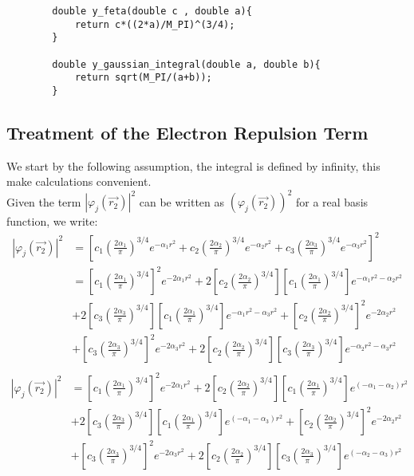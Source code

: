 \documentclass{article}
\begin{document}
\begin{lstlisting}
        double y_feta(double c , double a){
            return c*((2*a)/M_PI)^(3/4);
        }

        double y_gaussian_integral(double a, double b){
            return sqrt(M_PI/(a+b));
        }
\end{lstlisting}

\subsection{Treatment of the Electron Repulsion Term}
We start by the following assumption, the integral is defined by infinity, this make calculations convenient.\\
Given the term \( |\varphi_j(\vec{r_2})|^2\) can be written as \( (\varphi_j(\vec{r_2}))^2\) for a real basis function, we write: 
\begin{align*}
    |\varphi_j(\vec{r_2})|^2  &= \left[ c_1  \left( \frac{2\alpha_1}{\pi} \right)^{3/4} e^{-\alpha_1 r^2} + c_2 \left( \frac{2\alpha_2}{\pi} \right)^{3/4} e^{-\alpha_2 r^2} + c_3 \left( \frac{2\alpha_3}{\pi} \right)^{3/4} e^{-\alpha_3 r^2} \right] ^2 \\
                             &= \left[ c_1  \left( \frac{2\alpha_1}{\pi} \right)^{3/4} \right] ^2 e^{-2\alpha_1 r^2} + 2 \left[ c_2 \left( \frac{2\alpha_2}{\pi} \right)^{3/4} \right] \left[ c_1  \left( \frac{2\alpha_1}{\pi} \right)^{3/4} \right] e^{-\alpha_1 r^2 - \alpha_2 r^2} \\
                             &+ 2\left[ c_3 \left( \frac{2\alpha_3}{\pi} \right)^{3/4} \right] \left[ c_1  \left( \frac{2\alpha_1}{\pi} \right)^{3/4} \right] e^{-\alpha_1 r^2 - \alpha_3 r^2} + \left[ c_2  \left( \frac{2\alpha_2}{\pi} \right)^{3/4} \right] ^2 e^{-2\alpha_2 r^2} \\ 
                             &+ \left[ c_3  \left( \frac{2\alpha_3}{\pi} \right)^{3/4} \right] ^2 e^{-2\alpha_3 r^2} + 2 \left[ c_2 \left( \frac{2\alpha_2}{\pi} \right)^{3/4} \right] \left[ c_3  \left( \frac{2\alpha_3}{\pi} \right)^{3/4} \right] e^{-\alpha_2 r^2 - \alpha_3 r^2} \\
\end{align*}
\begin{align*}                             
    |\varphi_j(\vec{r_2})|^2                         &= \left[ c_1  \left( \frac{2\alpha_1}{\pi} \right)^{3/4} \right] ^2 e^{-2\alpha_1 r^2} + 2 \left[ c_2 \left( \frac{2\alpha_2}{\pi} \right)^{3/4} \right] \left[ c_1  \left( \frac{2\alpha_1}{\pi} \right)^{3/4} \right] e^{(-\alpha_1 - \alpha_2 )r^2} \\
                             &+ 2\left[ c_3 \left( \frac{2\alpha_3}{\pi} \right)^{3/4} \right] \left[ c_1  \left( \frac{2\alpha_1}{\pi} \right)^{3/4} \right] e^{(-\alpha_1  - \alpha_3 )r^2} + \left[ c_2  \left( \frac{2\alpha_2}{\pi} \right)^{3/4} \right] ^2 e^{-2\alpha_2 r^2} \\ 
                             &+ \left[ c_3  \left( \frac{2\alpha_3}{\pi} \right)^{3/4} \right] ^2 e^{-2\alpha_3 r^2} + 2 \left[ c_2 \left( \frac{2\alpha_2}{\pi} \right)^{3/4} \right] \left[ c_3  \left( \frac{2\alpha_3}{\pi} \right)^{3/4} \right] e^{(-\alpha_2 - \alpha_3 )r^2} \\
\end{align*}
\end{document}
